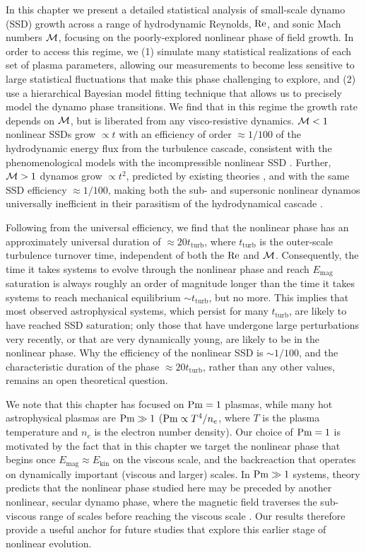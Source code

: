     In this chapter we present a detailed statistical analysis of small-scale dynamo (SSD) growth across a range of hydrodynamic Reynolds, $\mathrm{Re}$, and sonic Mach numbers $\mathcal{M}$, focusing on the poorly-explored nonlinear phase of field growth. In order to access this regime, we (1) simulate many statistical realizations of each set of plasma parameters, allowing our measurements to become less sensitive to large statistical fluctuations that make this phase challenging to explore, and (2) use a hierarchical Bayesian model fitting technique that allows us to precisely model the dynamo phase transitions. We find that in this regime the growth rate depends on $\mathcal{M}$, but is liberated from any visco-resistive dynamics. $\mathcal{M} < 1$ nonlinear SSDs grow $\propto t$ with an efficiency of order $\approx 1/100$ of the hydrodynamic energy flux from the turbulence cascade, consistent with the phenomenological models with the incompressible nonlinear SSD \citep{schekochihin2002model, xu2016turbulent}. Further, $\mathcal{M} > 1$ dynamos grow $\propto t^2$, predicted by existing theories \citep{schober2012magnetic, schleicher2013small}, and with the same SSD efficiency $\approx 1/100$, making both the sub- and supersonic nonlinear dynamos universally inefficient in their parasitism of the hydrodynamical cascade \citep{beresnyak2012universal}.

    Following from the universal efficiency, we find that the nonlinear phase has an approximately universal duration of $\approx 20t_\mathrm{turb}$, where $t_\mathrm{turb}$ is the outer-scale turbulence turnover time, independent of both the $\mathrm{Re}$ and $\mathcal{M}$. Consequently, the time it takes systems to evolve through the nonlinear phase and reach $E_{\mathrm{mag}}$ saturation is always roughly an order of magnitude longer than the time it takes systems to reach mechanical equilibrium $\sim t_\mathrm{turb}$, but no more. This implies that most observed astrophysical systems, which persist for many $t_\mathrm{turb}$, are likely to have reached SSD saturation; only those that have undergone large perturbations very recently, or that are very dynamically young, are likely to be in the nonlinear phase. Why the efficiency of the nonlinear SSD is $\sim 1/100$, and the characteristic duration of the phase $\approx 20 t_\mathrm{turb}$, rather than any other values, remains an open theoretical question.

    We note that this chapter has focused on $\mathrm{Pm} = 1$ plasmas, while many hot astrophysical plasmas are $\mathrm{Pm} \gg 1$ ($\mathrm{Pm} \propto T^4/n_e$, where $T$ is the plasma temperature and $n_e$ is the electron number density). Our choice of $\mathrm{Pm} = 1$ is motivated by the fact that in this chapter we target the nonlinear phase that begins once $E_\mathrm{mag} \approx E_\mathrm{kin}$ on the viscous scale, and the backreaction that operates on dynamically important (viscous and larger) scales. In $\mathrm{Pm} \gg 1$ systems, theory predicts that the nonlinear phase studied here may be preceded by another nonlinear, secular dynamo phase, where the magnetic field traverses the sub-viscous range of scales before reaching the viscous scale \citep{schekochihin2002model}. Our results therefore provide a useful anchor for future studies that explore this earlier stage of nonlinear evolution.


